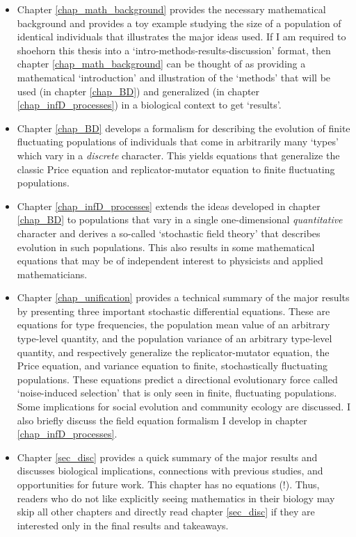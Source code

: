 \begin{itemize}
		\item Chapter \ref{chap_math_background} provides the necessary mathematical background and provides a toy example studying the size of a population of identical individuals that illustrates the major ideas used. If I am required to shoehorn this thesis into a `intro-methods-results-discussion' format, then chapter \ref{chap_math_background} can be thought of as providing a mathematical `introduction' and illustration of the `methods' that will be used (in chapter \ref{chap_BD}) and generalized (in chapter \ref{chap_infD_processes}) in a biological context to get `results'.
		\item Chapter \ref{chap_BD} develops a formalism for describing the evolution of finite fluctuating populations of individuals that come in arbitrarily many `types' which vary in a \emph{discrete} character. This yields equations that generalize the classic Price equation and replicator-mutator equation to finite fluctuating populations.
		\item Chapter \ref{chap_infD_processes} extends the ideas developed in chapter \ref{chap_BD} to populations that vary in a single one-dimensional \emph{quantitative} character and derives a so-called `stochastic field theory' that describes evolution in such populations. This also results in some mathematical equations that may be of independent interest to physicists and applied mathematicians.
		\item Chapter \ref{chap_unification} provides a technical summary of the major results by presenting three important stochastic differential equations. These are equations for type frequencies, the population mean value of an arbitrary type-level quantity, and the population variance of an arbitrary type-level quantity, and respectively generalize the replicator-mutator equation, the Price equation, and  variance equation to finite, stochastically fluctuating populations. These equations predict a directional evolutionary force called `noise-induced selection' that is only seen in finite, fluctuating populations. Some implications for social evolution and community ecology are discussed. I also briefly discuss the field equation formalism I develop in chapter \ref{chap_infD_processes}.
		\item Chapter \ref{sec_disc} provides a quick summary of the major results and discusses biological implications, connections with previous studies, and opportunities for future work. This chapter has no equations (!). Thus, readers who do not like explicitly seeing mathematics in their biology may skip all other chapters and directly read chapter \ref{sec_disc} if they are interested only in the final results and takeaways. 
\end{itemize}
